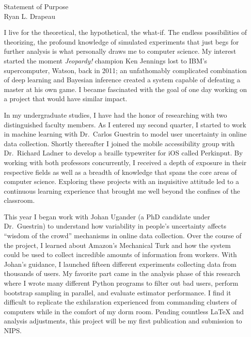 \setlength{\oddsidemargin}{0in}
\setlength{\evensidemargin}{0in}
\setlength{\textwidth}{6.5in}
\setlength{\topmargin}{-.65in}
\setlength{\textheight}{9in}
\pagestyle{empty}



\begin{center}
    {\Large Statement of Purpose} \\[3 mm]
    {\large Ryan L. Drapeau}
\end{center}

\vspace*{.075in}

I live for the theoretical, the hypothetical, the what-if. The endless possibilities of theorizing, the profound knowledge of simulated experiments that just begs for further analysis is what personally draws me to computer science. My interest started the moment {\it{Jeopardy!}} champion Ken Jennings lost to IBM's supercomputer, Watson, back in 2011; an unfathomably complicated combination of deep learning and Bayesian inference created a system capable of defeating a master at his own game. I became fascinated with the goal of one day working on a project that would have similar impact.\vspace{1 mm}

In my undergraduate studies, I have had the honor of researching with two distinguished faculty members. As I entered my second quarter, I started to work in machine learning with Dr.\ Carlos Guestrin to model user uncertainty in online data collection. Shortly thereafter I joined the mobile accessibility group with Dr.\ Richard Ladner to develop a braille typewriter for iOS called Perkinput. By working with both professors concurrently, I received a depth of exposure in their respective fields as well as a breadth of knowledge that spans the core areas of computer science. Exploring these projects with an inquisitive attitude led to a continuous learning experience that brought me well beyond the confines of the classroom.\vspace{1 mm}

This year I began work with Johan Ugander (a PhD candidate under Dr.\ Guestrin) to understand how variability in people’s uncertainty affects ``wisdom of the crowd'' mechanisms in online data collection. Over the course of the project, I learned about Amazon’s Mechanical Turk and how the system could be used to collect incredible amounts of information from workers. With Johan’s guidance, I launched fifteen different experiments collecting data from thousands of users. My favorite part came in the analysis phase of this research where I wrote many different Python programs to filter out bad users, perform bootstrap sampling in parallel, and evaluate estimator performance. I find it difficult to replicate the exhilaration experienced from commanding clusters of computers while in the comfort of my dorm room. Pending countless {\LaTeX} and analysis adjustments, this project will be my first publication and submission to NIPS.\vspace{1 mm}

